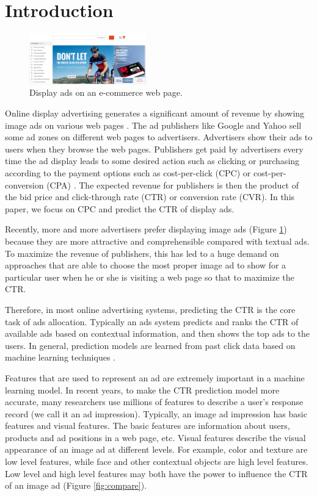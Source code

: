 \documentclass{sig-alternate}
\begin{document}
\section{Introduction}
\begin{figure}
	\centering
	\includegraphics[width=0.45\textwidth]{ad}
	\caption{Display ads on an e-commerce web page.}
	\label{fig:ad}
\end{figure}
Online display advertising generates a significant amount of revenue by showing image ads on various web pages \cite{chapelle2014simple}.   The ad publishers like Google and Yahoo sell some ad zones on different web pages to advertisers. Advertisers show their ads to users when they browse the web pages. Publishers get paid by advertisers every time the ad display leads to some desired action  such as clicking or purchasing according to the payment options such as cost-per-click (CPC) or cost-per-conversion (CPA) \cite{mahdian2007pay}. The expected revenue for publishers is then the product of the bid price and click-through rate (CTR) or conversion rate (CVR). In this paper, we focus on CPC and predict the CTR of display ads.

Recently, more and more advertisers prefer displaying image ads (Figure \ref{fig:ad}) because they are more attractive and comprehensible compared with textual ads.   To maximize the revenue of publishers,  this has led to a huge demand on approaches that are able to choose the most proper image ad to show for a particular user when he or she is visiting a web page so that to maximize the CTR. 

Therefore, in most online advertising systems, predicting the CTR is the core task of ads allocation. Typically an ads system  predicts and ranks the CTR of available ads based on contextual information, and then shows the top ads to the users. In general, prediction models are learned from past click data based on machine learning techniques \cite{chapelle2014simple,  richardson2007predicting, he2014practical, dave2010learning, zhang2016deep,mcmahan2013ad}.

Features that are used to represent an ad are extremely important in a machine learning model. In recent years, to make the CTR prediction model more accurate, many researchers use millions of features to describe a user's response record (we call it an ad impression). Typically, an image ad impression has basic features and visual features. The basic features are information about users, products and ad positions in a web page, etc. Visual features describe the visual appearance of an image ad at different levels. For example, color and  texture are low level features, while face and other contextual objects are high level features. Low level and high level features may both have the power to influence the CTR of an image ad (Figure \ref{fig:compare}).
\end{document}
